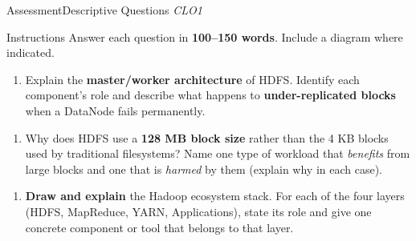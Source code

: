 \documentclass[aspectratio=169,10pt]{beamer}
\begin{document}
\begin{frame}{Assessment\textemdash Descriptive Questions \hfill\small\textit{CLO1}}
  \begin{block}{Instructions}
    Answer each question in \textbf{100--150 words}.  Include a diagram where indicated.
  \end{block}
  \vspace{10pt}
  \begin{enumerate}[\textbf{D1.}]
    \item Explain the \textbf{master/worker architecture} of HDFS.  Identify each component's role and describe what happens to \textbf{under-replicated blocks} when a DataNode fails permanently.
  \end{enumerate}
  \vspace{8pt}
  \begin{enumerate}[\textbf{D2.}]
    \item Why does HDFS use a \textbf{128 MB block size} rather than the 4 KB blocks used by traditional filesystems?  Name one type of workload that \emph{benefits} from large blocks and one that is \emph{harmed} by them (explain why in each case).
  \end{enumerate}
  \vspace{8pt}
  \begin{enumerate}[\textbf{D3.}]
    \item \textbf{Draw and explain} the Hadoop ecosystem stack.  For each of the four layers (HDFS, MapReduce, YARN, Applications), state its role and give one concrete component or tool that belongs to that layer.
  \end{enumerate}
\end{frame}
\end{document}
